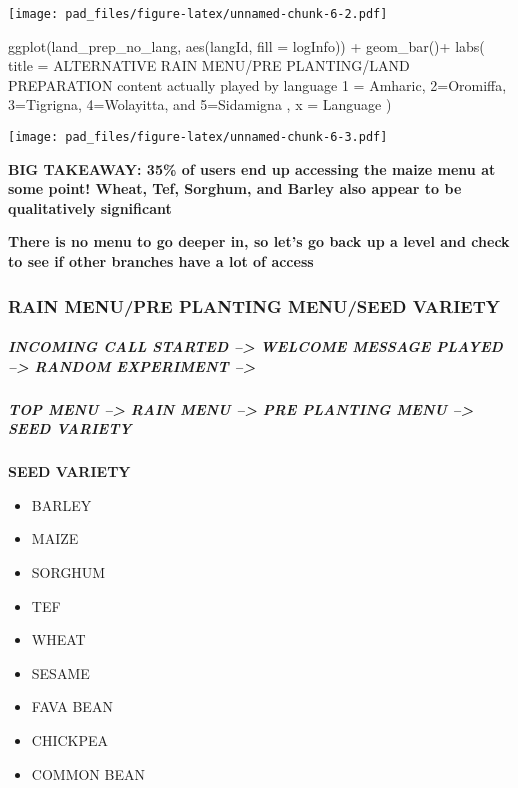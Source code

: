 \documentclass[
]{article}
\newenvironment{Shaded}{\begin{snugshade}}{\end{snugshade}}
\newcommand{\AttributeTok}[1]{\textcolor[rgb]{0.77,0.63,0.00}{#1}}
\newcommand{\FunctionTok}[1]{\textcolor[rgb]{0.00,0.00,0.00}{#1}}
\newcommand{\NormalTok}[1]{#1}
\newcommand{\SpecialCharTok}[1]{\textcolor[rgb]{0.00,0.00,0.00}{#1}}
\newcommand{\StringTok}[1]{\textcolor[rgb]{0.31,0.60,0.02}{#1}}
\providecommand{\tightlist}{%
  \setlength{\itemsep}{0pt}\setlength{\parskip}{0pt}}
\begin{document}
\texttt{[image: pad\_files/figure-latex/unnamed-chunk-6-2.pdf]}

\begin{Shaded}
\begin{Highlighting}[]
\FunctionTok{ggplot}\NormalTok{(land\_prep\_no\_lang, }\FunctionTok{aes}\NormalTok{(langId, }\AttributeTok{fill =}\NormalTok{ logInfo)) }\SpecialCharTok{+}
  \FunctionTok{geom\_bar}\NormalTok{()}\SpecialCharTok{+}
  \FunctionTok{labs}\NormalTok{(}
    \AttributeTok{title =} \StringTok{\textquotesingle{}ALTERNATIVE RAIN MENU/PRE PLANTING/LAND PREPARATION}
\StringTok{    content actually played by language}
\StringTok{    1 = Amharic, 2=Oromiffa, 3=Tigrigna, 4=Wolayitta, and 5=Sidamigna}
\StringTok{    \textquotesingle{}}\NormalTok{,}
    \AttributeTok{x =} \StringTok{\textquotesingle{}Language\textquotesingle{}}
\NormalTok{  )}
\end{Highlighting}
\end{Shaded}

\texttt{[image: pad\_files/figure-latex/unnamed-chunk-6-3.pdf]}

\textbf{BIG TAKEAWAY: 35\% of users end up accessing the maize menu at
some point! Wheat, Tef, Sorghum, and Barley also appear to be
qualitatively significant}

\textbf{There is no menu to go deeper in, so let's go back up a level
and check to see if other branches have a lot of access}

\hypertarget{rain-menupre-planting-menuseed-variety}{%
\subsubsection{RAIN MENU/PRE PLANTING MENU/SEED
VARIETY}\label{rain-menupre-planting-menuseed-variety}}

\hypertarget{incoming-call-started-welcome-message-played-random-experiment-2}{%
\subparagraph{INCOMING CALL STARTED --\textgreater{} WELCOME MESSAGE
PLAYED --\textgreater{} RANDOM EXPERIMENT
--\textgreater{}}\label{incoming-call-started-welcome-message-played-random-experiment-2}}

\hypertarget{top-menu-rain-menu-pre-planting-menu-seed-variety}{%
\subparagraph{TOP MENU --\textgreater{} RAIN MENU --\textgreater{} PRE
PLANTING MENU --\textgreater{} SEED
VARIETY}\label{top-menu-rain-menu-pre-planting-menu-seed-variety}}

\textbf{SEED VARIETY}

\begin{itemize}
\tightlist
\item
  BARLEY
\item
  MAIZE
\item
  SORGHUM
\item
  TEF
\item
  WHEAT
\item
  SESAME
\item
  FAVA BEAN
\item
  CHICKPEA
\item
  COMMON BEAN
\end{itemize}
\end{document}
